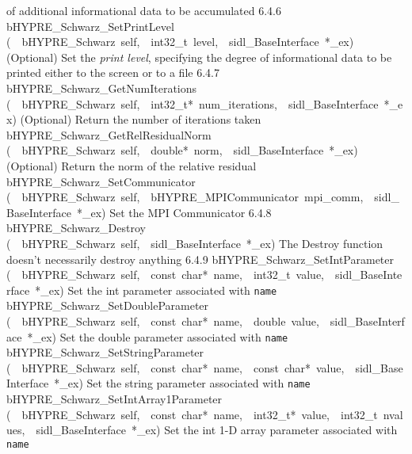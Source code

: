\documentclass{article}
\begin{document}
\begin{cxxentry}
\begin{cxxentry}
\begin{cxxnames}
{of additional informational data to be accumulated}
        {6.4.6}
        {bHYPRE\_Schwarz\_SetPrintLevel}
        {(\ \ bHYPRE\_Schwarz\ self,\ \ int32\_t\ level,\ \ sidl\_BaseInterface\ *\_ex)}
        {
(Optional) Set the {\it print level}, specifying the degree
of informational data to be printed either to the screen or
to a file}
        {6.4.7}
        {bHYPRE\_Schwarz\_GetNumIterations}
        {(\ \ bHYPRE\_Schwarz\ self,\ \ int32\_t*\ num\_iterations,\ \ sidl\_BaseInterface\ *\_ex)}
        {
(Optional) Return the number of iterations taken}
        {}
\label{cxx.6.4.15}
        {bHYPRE\_Schwarz\_GetRelResidualNorm}
        {(\ \ bHYPRE\_Schwarz\ self,\ \ double*\ norm,\ \ sidl\_BaseInterface\ *\_ex)}
        {
(Optional) Return the norm of the relative residual}
        {}
\label{cxx.6.4.16}
        {bHYPRE\_Schwarz\_SetCommunicator}
        {(\ \ bHYPRE\_Schwarz\ self,\ \ bHYPRE\_MPICommunicator\ mpi\_comm,\ \ sidl\_BaseInterface\ *\_ex)}
        {
Set the MPI Communicator}
        {6.4.8}
        {bHYPRE\_Schwarz\_Destroy}
        {(\ \ bHYPRE\_Schwarz\ self,\ \ sidl\_BaseInterface\ *\_ex)}
        {
The Destroy function doesn't necessarily destroy anything}
        {6.4.9}
        {bHYPRE\_Schwarz\_SetIntParameter}
        {(\ \ bHYPRE\_Schwarz\ self,\ \ const\ char*\ name,\ \ int32\_t\ value,\ \ sidl\_BaseInterface\ *\_ex)}
        {
Set the int parameter associated with {\tt name}}
        {}
\label{cxx.6.4.17}
        {bHYPRE\_Schwarz\_SetDoubleParameter}
        {(\ \ bHYPRE\_Schwarz\ self,\ \ const\ char*\ name,\ \ double\ value,\ \ sidl\_BaseInterface\ *\_ex)}
        {
Set the double parameter associated with {\tt name}}
        {}
\label{cxx.6.4.18}
        {bHYPRE\_Schwarz\_SetStringParameter}
        {(\ \ bHYPRE\_Schwarz\ self,\ \ const\ char*\ name,\ \ const\ char*\ value,\ \ sidl\_BaseInterface\ *\_ex)}
        {
Set the string parameter associated with {\tt name}}
        {}
\label{cxx.6.4.19}
        {bHYPRE\_Schwarz\_SetIntArray1Parameter}
        {(\ \ bHYPRE\_Schwarz\ self,\ \ const\ char*\ name,\ \ int32\_t*\ value,\ \ int32\_t\ nvalues,\ \ sidl\_BaseInterface\ *\_ex)}
        {
Set the int 1-D array parameter associated with {\tt name}}

\end{cxxnames}
\end{cxxentry}
\end{cxxentry}
\end{document}
